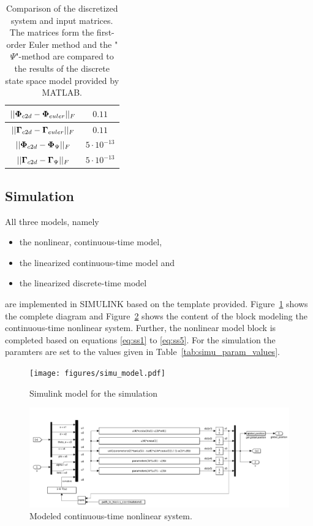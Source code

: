 \begin{table}[h]
	\centering
	\begin{tabular}{c|c}
	\hline
		 $||\boldsymbol{\Phi}_{c2d} - \boldsymbol{\Phi}_{euler}||_F$& $0.11$ \\\hline
		 $||\boldsymbol{\Gamma}_{c2d} - \boldsymbol{\Gamma}_{euler}||_F$& $0.11$ \\\hline
		 $||\boldsymbol{\Phi}_{c2d} - \boldsymbol{\Phi}_{\Psi}||_F$& $5 \cdot 10^{-13}$ \\\hline
		 $||\boldsymbol{\Gamma}_{c2d} - \boldsymbol{\Gamma}_{\Psi}||_F$& $5 \cdot 10^{-13}$ \\\hline
	\end{tabular}
	\caption{Comparison of the discretized system and input matrices. The matrices form the first-order Euler method and the "$\Psi$"-method are compared to the results of the discrete state space model provided by MATLAB.}
	\label{tab:disc_comp}
\end{table}

\subsection{Simulation}
All three models, namely
\begin{itemize}
	\item the nonlinear, continuous-time model,
	\item the linearized continuous-time model and
	\item the linearized discrete-time model
\end{itemize}
are implemented in SIMULINK based on the template provided. 
Figure~\ref{fig:simu_simulink} shows the complete diagram and Figure~\ref{fig:simu_nonlin_simulink} shows the content of the block modeling the continuous-time nonlinear system.
Further, the nonlinear model block is completed based on equations \eqref{eq:ss1} to \eqref{eq:ss5}.
For the simulation the paramters are set to the values given in Table~\ref{tab:simu_param_values}.

\begin{figure}[h]
	\centering
	\texttt{[image: figures/simu\_model.pdf]}
	\caption{Simulink model for the simulation}
	\label{fig:simu_simulink}
\end{figure}
\begin{figure}[h]
	\centering
	\includegraphics[width=\textwidth]{figures/simulink_nonlin_block.png}
	\caption{Modeled continuous-time nonlinear system.}
	\label{fig:simu_nonlin_simulink}
\end{figure}

